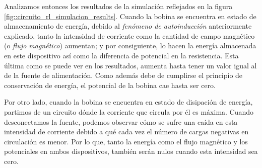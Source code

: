 \documentclass[../main.tex]{subfiles}
\begin{document}
Analizamos entonces los resultados de la simulación reflejados en la figura \ref{fig::circuito_rl_simulacion_results}. Cuando la bobina se encuentra en estado de almacenamiento de energía, debido al \textit{fenómeno de autoinducción} anteriormente explicado, tanto la intensidad de corriente como la cantidad de campo magnético (o \textit{flujo magnético}) aumentan; y por consiguiente, lo hacen la energía almacenada en este dispositivo así como la diferencia de potencial en la resistencia. Esta última como se puede ver en los resultados, aumenta hasta tener un valor igual al de la fuente de alimentación. Como además debe de cumplirse el principio de conservación de energía, el potencial de la bobina cae hasta ser cero.

Por otro lado, cuando la bobina se encuentra en estado de disipación de energía, partimos de un circuito dónde la corriente que circula por él es máxima. Cuando desconectamos la fuente, podemos observar cómo se sufre una caída en esta intensidad de corriente debido a qué cada vez el número de cargas negativas en circulación es menor. Por lo que, tanto la energía como el flujo magnético y los potenciales en ambos dispositivos, también serán nulos cuando esta intensidad sea cero. 
\end{document}
